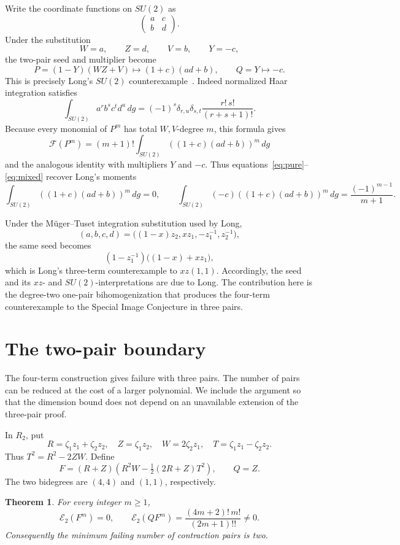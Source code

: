 \documentclass[11pt]{article}
\newtheorem{theorem}{Theorem}
\newcommand{\Eop}{\mathcal E}
\begin{document}
Write the coordinate functions on \(SU(2)\) as
\[
 \begin{pmatrix}a&c\\ b&d\end{pmatrix}.
\]
Under the substitution
\[
 W=a,\qquad Z=d,\qquad V=b,\qquad Y=-c,
\]
the two-pair seed and multiplier become
\[
 P=(1-Y)(WZ+V)\longmapsto(1+c)(ad+b),\qquad
 Q=Y\longmapsto-c.
\]
This is precisely Long's \(SU(2)\) counterexample~\cite[Theorem 4.2]{Long2026}.
Indeed normalized Haar integration satisfies
\[
 \int_{SU(2)}a^r b^s c^t d^u\,dg
 =(-1)^s\delta_{r,u}\delta_{s,t}
   \frac{r!\,s!}{(r+s+1)!}.
\]
Because every monomial of \(P^m\) has total \(W,V\)-degree \(m\),
this formula gives
\[
 \mathcal F(P^m)=(m+1)!\int_{SU(2)}((1+c)(ad+b))^m\,dg
\]
and the analogous identity with multipliers \(Y\) and \(-c\).
Thus equations~\eqref{eq:pure}--\eqref{eq:mixed} recover Long's moments
\[
 \int_{SU(2)}((1+c)(ad+b))^m\,dg=0,\qquad
 \int_{SU(2)}(-c)((1+c)(ad+b))^m\,dg
 =\frac{(-1)^{m-1}}{m+1}.
\]

Under the Müger--Tuset integration substitution used by Long,
\[
 (a,b,c,d)
 =\bigl((1-x)z_2,xz_1,-z_1^{-1},z_2^{-1}\bigr),
\]
the same seed becomes
\[
 (1-z_1^{-1})\bigl((1-x)+xz_1\bigr),
\]
which is Long's three-term counterexample to \(xz(1,1)\).
Accordingly, the seed and its \(xz\)- and \(SU(2)\)-interpretations are
due to Long.  The contribution here is the degree-two one-pair
bihomogenization that produces the four-term counterexample to the Special
Image Conjecture in three pairs.

\section{The two-pair boundary}\label{sec:two-pair}

The four-term construction gives failure with three pairs. The number of
pairs can be reduced at the cost of a larger polynomial. We include the
argument so that the dimension bound does not depend on an unavailable
extension of the three-pair proof.

In \(R_2\), put
\[
 R=\zeta_1z_1+\zeta_2z_2,\quad Z=\zeta_1z_2,\quad
 W=2\zeta_2z_1,\quad T=\zeta_1z_1-\zeta_2z_2.
\]
Thus \(T^2=R^2-2ZW\). Define
\[
 F=(R+Z)\left(R^2W-\tfrac12(2R+Z)T^2\right),
 \qquad Q=Z.
\]
The two bidegrees are \((4,4)\) and \((1,1)\), respectively.

\begin{theorem}\label{thm:two-pair}
For every integer \(m\geq1\),
\[
 \Eop_2(F^m)=0,\qquad
 \Eop_2(QF^m)=\frac{(4m+2)!\,m!}{(2m+1)!!}\ne0.
\]
Consequently the minimum failing number of contraction pairs is two.
\end{theorem}
\end{document}
